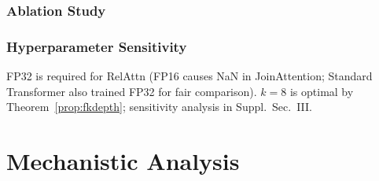 \documentclass[conference]{IEEEtran}
\begin{document}
\subsubsection{Ablation Study}

\begin{table}[t]
\centering
\caption{Component ablation ($d{=}512$, 12~enc/dec layers). All entries measured, 3 seeds each; mean~$\pm$~population std.}
\label{tab:ablation}
\end{table}


\subsubsection{Hyperparameter Sensitivity}

FP32 is required for RelAttn (FP16 causes NaN in JoinAttention; Standard Transformer also trained FP32 for fair comparison). $k{=}8$ is optimal by Theorem~\ref{prop:fkdepth}; sensitivity analysis in Suppl.\ Sec.~III.

\section{Mechanistic Analysis}
\label{sec:analysis}
\end{document}
